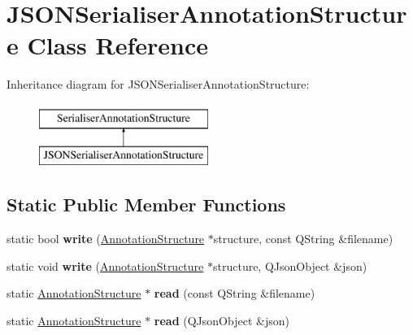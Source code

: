 \hypertarget{class_j_s_o_n_serialiser_annotation_structure}{}\section{J\+S\+O\+N\+Serialiser\+Annotation\+Structure Class Reference}
\label{class_j_s_o_n_serialiser_annotation_structure}
Inheritance diagram for J\+S\+O\+N\+Serialiser\+Annotation\+Structure\+:\begin{figure}[H]
\begin{center}
\leavevmode
\includegraphics[height=2.000000cm]{class_j_s_o_n_serialiser_annotation_structure}
\end{center}
\end{figure}
\subsection*{Static Public Member Functions}
\begin{DoxyCompactItemize}
\item 
\mbox{\label{class_j_s_o_n_serialiser_annotation_structure_ab6111e0c9c1d340b20331e6788a38672}} 
static bool {\bfseries write} (\hyperlink{class_annotation_structure}{Annotation\+Structure} $\ast$structure, const Q\+String \&filename)
\item 
\mbox{\label{class_j_s_o_n_serialiser_annotation_structure_a3fe157fe01ea22ca087997c6596df6e9}} 
static void {\bfseries write} (\hyperlink{class_annotation_structure}{Annotation\+Structure} $\ast$structure, Q\+Json\+Object \&json)
\item 
\mbox{\label{class_j_s_o_n_serialiser_annotation_structure_a1e6e7f95022357f1f511ecf2cb5a05b8}} 
static \hyperlink{class_annotation_structure}{Annotation\+Structure} $\ast$ {\bfseries read} (const Q\+String \&filename)
\item 
\mbox{\label{class_j_s_o_n_serialiser_annotation_structure_a1039b5cd5551a5b3072a21b94683715a}} 
static \hyperlink{class_annotation_structure}{Annotation\+Structure} $\ast$ {\bfseries read} (Q\+Json\+Object \&json)
\end{DoxyCompactItemize}
